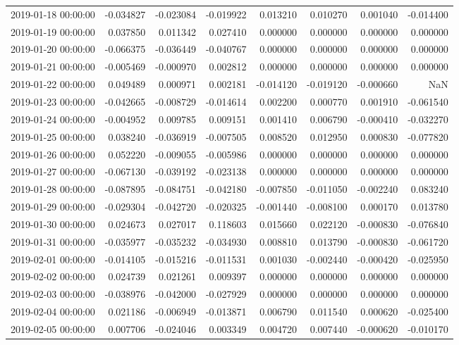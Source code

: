 \begin{tabular}{lrrrrrrr}
2019-01-18 00:00:00 & -0.034827 & -0.023084 & -0.019922 & 0.013210 & 0.010270 & 0.001040 & -0.014400 \\
2019-01-19 00:00:00 & 0.037850 & 0.011342 & 0.027410 & 0.000000 & 0.000000 & 0.000000 & 0.000000 \\
2019-01-20 00:00:00 & -0.066375 & -0.036449 & -0.040767 & 0.000000 & 0.000000 & 0.000000 & 0.000000 \\
2019-01-21 00:00:00 & -0.005469 & -0.000970 & 0.002812 & 0.000000 & 0.000000 & 0.000000 & 0.000000 \\
2019-01-22 00:00:00 & 0.049489 & 0.000971 & 0.002181 & -0.014120 & -0.019120 & -0.000660 & NaN \\
2019-01-23 00:00:00 & -0.042665 & -0.008729 & -0.014614 & 0.002200 & 0.000770 & 0.001910 & -0.061540 \\
2019-01-24 00:00:00 & -0.004952 & 0.009785 & 0.009151 & 0.001410 & 0.006790 & -0.000410 & -0.032270 \\
2019-01-25 00:00:00 & 0.038240 & -0.036919 & -0.007505 & 0.008520 & 0.012950 & 0.000830 & -0.077820 \\
2019-01-26 00:00:00 & 0.052220 & -0.009055 & -0.005986 & 0.000000 & 0.000000 & 0.000000 & 0.000000 \\
2019-01-27 00:00:00 & -0.067130 & -0.039192 & -0.023138 & 0.000000 & 0.000000 & 0.000000 & 0.000000 \\
2019-01-28 00:00:00 & -0.087895 & -0.084751 & -0.042180 & -0.007850 & -0.011050 & -0.002240 & 0.083240 \\
2019-01-29 00:00:00 & -0.029304 & -0.042720 & -0.020325 & -0.001440 & -0.008100 & 0.000170 & 0.013780 \\
2019-01-30 00:00:00 & 0.024673 & 0.027017 & 0.118603 & 0.015660 & 0.022120 & -0.000830 & -0.076840 \\
2019-01-31 00:00:00 & -0.035977 & -0.035232 & -0.034930 & 0.008810 & 0.013790 & -0.000830 & -0.061720 \\
2019-02-01 00:00:00 & -0.014105 & -0.015216 & -0.011531 & 0.001030 & -0.002440 & -0.000420 & -0.025950 \\
2019-02-02 00:00:00 & 0.024739 & 0.021261 & 0.009397 & 0.000000 & 0.000000 & 0.000000 & 0.000000 \\
2019-02-03 00:00:00 & -0.038976 & -0.042000 & -0.027929 & 0.000000 & 0.000000 & 0.000000 & 0.000000 \\
2019-02-04 00:00:00 & 0.021186 & -0.006949 & -0.013871 & 0.006790 & 0.011540 & 0.000620 & -0.025400 \\
2019-02-05 00:00:00 & 0.007706 & -0.024046 & 0.003349 & 0.004720 & 0.007440 & -0.000620 & -0.010170 \\

\end{tabular}
